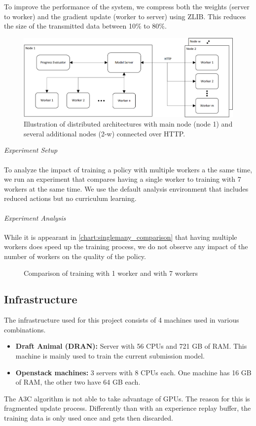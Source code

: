 To improve the performance of the system, we compress both the weights (server to worker) and the gradient update (worker to server) using ZLIB. This reduces the size of the transmitted data between 10\% to 80\%.
\begin{figure}[H]
	\centering
	\includegraphics[width=400pt]{images/visio/architecture.png}
	\caption{Illustration of distributed architectures with main node (node 1) and several additional nodes (2-w) connected over HTTP.}
	\label{dist_architecture_img}
\end{figure}
\textit{Experiment Setup}\\\\
To analyze the impact of training a policy with multiple workers a the same time, we run an experiment that compares having a single worker to training with 7 workers at the same time. We use the default analysis environment that includes reduced actions but no curriculum learning.\\\\
\textit{Experiment Analysis}\\\\
While it is appearant in \autoref{chart:singlemany_comparison} that having multiple workers does speed up the training process, we do not observe any impact of the number of workers on the quality of the policy.
\begin{figure}[H]
	\begin{center}
		
	\end{center}
	\caption{Comparison of training with 1 worker and with 7 workers}
	\label{chart:singlemany_comparison}
\end{figure}
\subsection*{Infrastructure}\label{infrastructure}
The infrastructure used for this project consists of 4 machines used in various combinations.
\begin{itemize}
	\item \textbf{Draft Animal (DRAN):} Server with 56 CPUs and 721 GB of RAM. This machine is mainly used to train the current submission model.
	\item \textbf{Openstack machines:} 3 servers with 8 CPUs each. One machine has 16 GB of RAM, the other two have 64 GB each.
\end{itemize}
The A3C algorithm is not able to take advantage of GPUs. The reason for this is fragmented update process. Differently than with an experience replay buffer, the training data is only used once and gets then discarded.
\newpage



